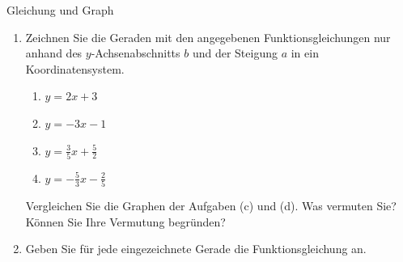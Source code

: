 \clearpage
\begin{ueb}
    {Gleichung und Graph}{}
    \begin{enumerate}

        \item Zeichnen Sie die Geraden mit den angegebenen Funktionsgleichungen
              nur anhand des \(y\)-Achsenabschnitts \(b\) und der Steigung \(a\)
              in ein Koordinatensystem.

              \begin{enumerate}
                  \item \(y=2x+3\)
                  \item \(y=-3x-1\)
                  \item \(y=\frac{3}{5}x+\frac{5}{2}\)
                  \item \(y=-\frac{5}{3}x-\frac{2}{5}\)
              \end{enumerate}
              Vergleichen Sie die Graphen der Aufgaben (c) und (d). Was vermuten Sie? Können Sie Ihre Vermutung begründen?
        \item Geben Sie für jede eingezeichnete Gerade die Funktionsgleichung an.





\end{enumerate}
\end{ueb}
